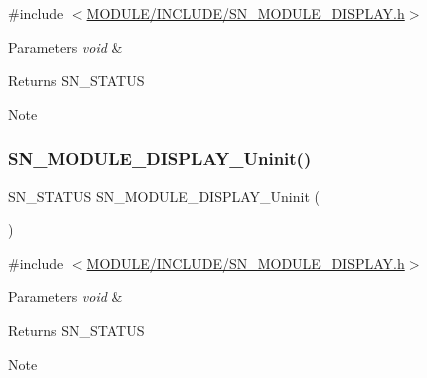 {\ttfamily \#include $<$\hyperlink{SN__MODULE__DISPLAY_8h}{M\+O\+D\+U\+L\+E/\+I\+N\+C\+L\+U\+D\+E/\+S\+N\+\_\+\+M\+O\+D\+U\+L\+E\+\_\+\+D\+I\+S\+P\+L\+A\+Y.\+h}$>$}


\begin{DoxyParams}{Parameters}
{\em void} & \\
\hline
\end{DoxyParams}
\begin{DoxyReturn}{Returns}
S\+N\+\_\+\+S\+T\+A\+T\+US
\end{DoxyReturn}
\begin{DoxyNote}{Note}

\end{DoxyNote}
\mbox{\label{group__DISPLAY_ga91f86811b5f4b83be3296c64ccd253ec}} 
\subsubsection{\texorpdfstring{S\+N\+\_\+\+M\+O\+D\+U\+L\+E\+\_\+\+D\+I\+S\+P\+L\+A\+Y\+\_\+\+Uninit()}{SN\_MODULE\_DISPLAY\_Uninit()}}
{\footnotesize\ttfamily S\+N\+\_\+\+S\+T\+A\+T\+US S\+N\+\_\+\+M\+O\+D\+U\+L\+E\+\_\+\+D\+I\+S\+P\+L\+A\+Y\+\_\+\+Uninit (\begin{DoxyParamCaption}\item[{void}]{ }\end{DoxyParamCaption})}



{\ttfamily \#include $<$\hyperlink{SN__MODULE__DISPLAY_8h}{M\+O\+D\+U\+L\+E/\+I\+N\+C\+L\+U\+D\+E/\+S\+N\+\_\+\+M\+O\+D\+U\+L\+E\+\_\+\+D\+I\+S\+P\+L\+A\+Y.\+h}$>$}


\begin{DoxyParams}{Parameters}
{\em void} & \\
\hline
\end{DoxyParams}
\begin{DoxyReturn}{Returns}
S\+N\+\_\+\+S\+T\+A\+T\+US 
\end{DoxyReturn}
\begin{DoxyNote}{Note}

\end{DoxyNote}
